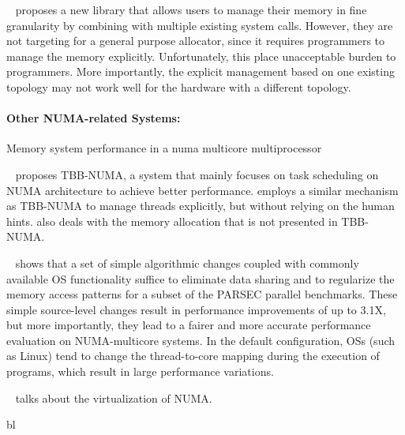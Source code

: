 
~\cite{cantalupo2015memkind} proposes a new library that allows users to manage their memory in fine granularity by combining with multiple existing system calls. However, they are not targeting for a general purpose allocator, since it requires programmers to manage the memory explicitly. Unfortunately, this place unacceptable burden to programmers. More importantly, the explicit management based on one existing topology may not work well for the hardware with a different topology. 



\paragraph{Other NUMA-related Systems:} 

Memory system performance in a numa multicore multiprocessor

~\cite{Majo:2015:LPC:2688500.2688509} proposes TBB-NUMA, a system that mainly focuses on task scheduling on NUMA architecture to achieve better performance. \NM{} employs a similar mechanism as TBB-NUMA to manage threads explicitly, but without relying on the human hints. \NM{} also deals with the memory allocation that is not presented in TBB-NUMA. 

~\cite{6704666} shows that a set of simple algorithmic changes coupled with commonly available OS functionality suffice to eliminate data sharing and to regularize the memory access patterns for a subset of the PARSEC parallel benchmarks. These simple source-level changes result in performance improvements of up to 3.1X, but more importantly, they lead to a fairer and more accurate performance evaluation on NUMA-multicore systems. In the default
configuration, OSs (such as Linux) tend to change the thread-to-core mapping during the execution of programs, which result in large performance variations.

~\cite{Bui:2019:EPV:3302424.3303960} talks about the virtualization of NUMA.

 bl

